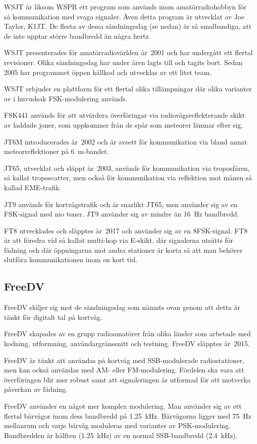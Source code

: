 WSJT är liksom WSPR ett program som används inom amatörradiohobbyn för så
kommunikation med svaga signaler.
Även detta program är utvecklat av Joe Taylor, K1JT.
De flesta av dessa sändningsslag (se nedan) är så smalbandiga, att de inte
upptar större bandbredd än några hertz.

\begin{historiabox}
WSJT presenterades för amatörradiovärlden år~2001 och har undergått ett flertal
revisioner.
Olika sändningsslag har under åren lagts till och tagits bort.
Sedan 2005 har programmet öppen källkod och utvecklas av ett litet team.
\end{historiabox}

WSJT erbjuder en plattform för ett flertal olika tillämpningar där olika
varianter av i huvudsak FSK-modulering används.

FSK441 används för att utvärdera överföringar via radiovågsreflekterande skikt
av laddade joner, som uppkommer från de spår som meteorer lämnar efter sig.

JT6M introducerades år~2002 och är avsett för kommunikation via bland annat
meteorreflektioner på \qty{6}{\metre}-bandet.

JT65, utvecklat och släppt år~2003, används för kommunikation via troposfären,
så kallat troposcatter, men också för kommunikation via reflektion mot månen
så kallad EME-trafik.

JT9 används för kortvågstrafik och är snarlikt JT65, men använder sig av en
FSK-signal med nio toner.
JT9 använder sig av mindre än \qty{16}{\hertz} bandbredd.

FT8 utvecklades och släpptes år~2017 och använder sig av en 8FSK-signal.
FT8 är att föredra vid så kallat multi-hop via E-skikt, där signalerna utsätts
för fädning och där öppningarna mot andra stationer är korta så att man behöver
slutföra kommunikationen inom en kort tid.

\subsection{FreeDV}

FreeDV skiljer sig mot de sändningsslag som nämnts ovan genom att detta är tänkt
för digitalt tal på kortvåg.

\begin{historiabox}
FreeDV skapades av en grupp radioamatörer från olika länder som arbetade
med kodning, utformning, användargränssnitt och testning.
FreeDV släpptes år~2015.
\end{historiabox}

FreeDV är tänkt att användas på kortvåg med SSB-modulerade radiostationer,
men kan också användas med AM- eller FM-modulering.
Fördelen ska vara att överföringen blir mer robust samt att signaleringen är
utformad för att motverka påverkan av fädning.

FreeDV använder en något mer komplex modulering.
Man använder sig av ett flertal bärvågor inom dess bandbredd på
\qty{1,25}{\kilo\hertz}.
Bärvägorna ligger med \qty{75}{\hertz} mellanrum och varje bärvåg moduleras med
varianter av PSK-modulering.
Bandbredden är hälften (\qty{1,25}{\kilo\hertz}) av en normal SSB-bandbredd
(\qty{2,4}{\kilo\hertz}).
